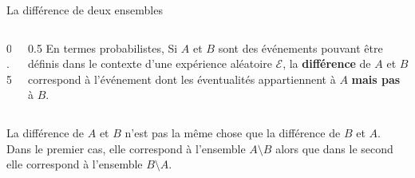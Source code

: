\documentclass[nuit,charter,pied,handout]{BeamerJS}
\begin{document}
\begin{frame}[t]{La différence de deux ensembles}
\pause
	\begin{columns}[c]
		\begin{column}{0.5\textwidth}
		\end{column}
		\pause
		\begin{column}{0.5\textwidth}
			En termes probabilistes, Si \(A\) et \(B\) sont des événements pouvant être définis dans le contexte d'une expérience aléatoire $\mathcal{E}$, la \textbf{différence} de \(A\) et \(B\) correspond à l'événement dont les éventualités appartiennent à \(A\) \textbf{mais pas} à \(B\).
		\end{column}
	\end{columns}
	\pause
	\begin{lumiere}
		La différence de \(A\) et \(B\) n'est pas la même chose que la différence de \(B\) et \(A\). Dans le premier cas, elle correspond à l'ensemble \(A\setminus B\) alors que dans le second elle correspond à l'ensemble \(B\setminus A\).
	\end{lumiere}
\end{frame}
\end{document}
